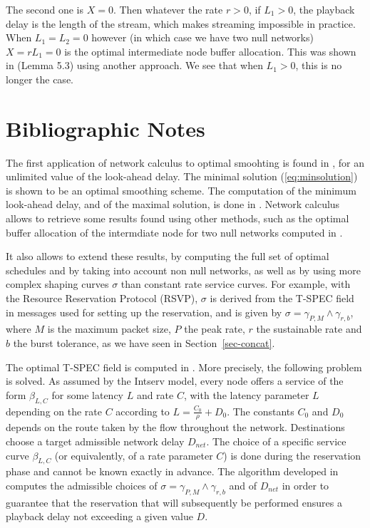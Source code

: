 The second one is $X = 0$. Then whatever the rate $r > 0$, if $L_1 > 0$, the playback delay is the length of the stream, which makes streaming impossible in practice. When $L_1 = L_2 = 0$ however (in which case we have two null networks) $X = rL_1 = 0$ is the optimal intermediate node buffer allocation. This was shown in \cite{RexfordTowsley99}(Lemma 5.3) using another approach. We see that when $L_1 > 0$, this is no longer the case.


\section{Bibliographic Notes}

The first application of network calculus to optimal smoohting is found in \cite{LeBoudecVerscheure98}, for an unlimited value of the look-ahead delay. The minimal solution (\ref{eq:minsolution}) is shown to be an optimal smoothing scheme. The computation of the minimum look-ahead delay, and of the maximal solution, is done in \cite{thilebworm2001}. Network calculus allows to retrieve some results found using other methods, such as the optimal buffer allocation of the intermdiate node for two null networks computed in \cite{RexfordTowsley99}.

It also allows to extend these results, by computing the full set of optimal schedules and by taking into account non null networks,
as well as by using more complex shaping curves $\sigma$ than constant rate service curves. For example, with the Resource Reservation Protocol (RSVP),
$\sigma$ is derived from the T-SPEC field in messages used for
setting up the reservation, and is given by
$\sigma = \gamma_{P,M} \wedge \gamma_{r,b}$, where $M$ is the maximum packet size,
$P$ the peak rate, $r$ the sustainable rate and $b$ the burst
tolerance, as we have seen in Section~\ref{sec-concat}.

The optimal T-SPEC field is computed in \cite{LeBoudecVerscheure98}. More precisely, the following problem
is solved.  As assumed by the Intserv model, every node offers a service of the form $\beta_{L,C}$ for some latency $L$ and rate $C$, with the latency parameter $L$ depending on the rate $C$ according to
$L=\frac{C_0}{\rho}+D_0$.  The constants $C_0$
and $D_0$ depends on the route taken by the flow throughout the
network. Destinations choose a target admissible network delay
$D_{net}$. The choice of a specific service curve $\beta_{L,C}$
(or equivalently, of a rate parameter $C$) is done
during the reservation phase and cannot be known exactly in
advance. The algorithm developed in  \cite{LeBoudecVerscheure98}
computes the admissible choices of $\sigma = \gamma_{P,M} \wedge \gamma_{r,b}$ and of $D_{net}$
in order to guarantee that the reservation that
will subsequently be performed ensures a playback delay not
exceeding a given value $D$.
